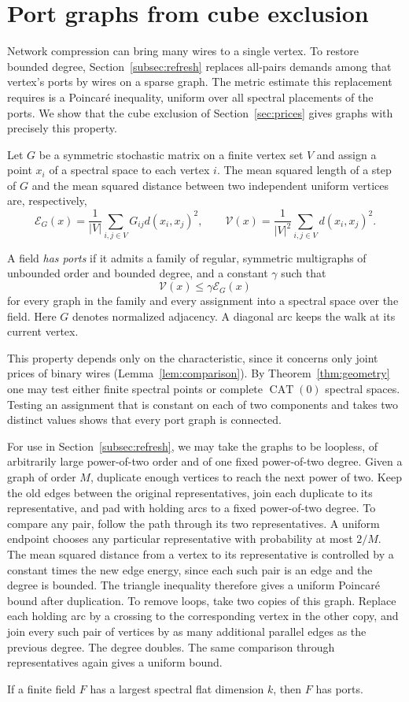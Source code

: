 \section{Port graphs from cube exclusion}\label{sec:ports}

Network compression can bring many wires to a single vertex. To restore
bounded degree, Section~\ref{subsec:refresh} replaces all-pairs demands
among that vertex's ports by wires on a sparse graph. The metric estimate
this replacement requires is a Poincar\'e inequality, uniform over all
spectral placements of the ports. We show that the cube exclusion of
Section~\ref{sec:prices} gives graphs with precisely this property.

Let $G$ be a symmetric stochastic matrix on a finite vertex set $V$
and assign a point $x_i$ of a spectral space to each vertex $i$. The
mean squared length of a step of $G$ and the mean squared distance
between two independent uniform vertices are, respectively,
\[
 \mathcal E_G(x)=\frac1{|V|}\sum_{i,j\in V}G_{ij}d(x_i,x_j)^2,
 \qquad
 \mathcal V(x)=\frac1{|V|^2}\sum_{i,j\in V}d(x_i,x_j)^2.
\]

\begin{definition}\label{def:ports}
A field \emph{has ports} if it admits a family of regular, symmetric
multigraphs of unbounded order and bounded degree, and a constant
$\gamma$ such that
\[
 \mathcal V(x)\le\gamma\mathcal E_G(x)
\]
for every graph in the family and every assignment into a spectral space
over the field. Here $G$ denotes normalized adjacency. A diagonal arc
keeps the walk at its current vertex.
\end{definition}
This property depends only on the characteristic, since it concerns
only joint prices of binary wires (Lemma~\ref{lem:comparison}).
By Theorem~\ref{thm:geometry} one may test either finite spectral
points or complete $\operatorname{CAT}(0)$ spectral spaces. Testing
an assignment that is constant on each of two components and takes two
distinct values shows that every port graph is connected.

For use in Section~\ref{subsec:refresh}, we may take the graphs to be
loopless, of arbitrarily large power-of-two order and of one fixed
power-of-two degree. Given a graph of order $M$, duplicate enough
vertices to reach the next power of two. Keep the old edges between
the original representatives, join each duplicate to its representative,
and pad with holding arcs to a fixed power-of-two degree. To compare any
pair, follow the path through its two representatives. A uniform endpoint
chooses any particular representative with probability at most $2/M$.
The mean squared distance from a vertex to its representative is controlled
by a constant times the new edge energy, since each such pair is an edge
and the degree is bounded. The triangle inequality therefore gives a
uniform Poincar\'e bound after duplication. To remove loops, take two
copies of this graph. Replace each holding arc by a crossing to the
corresponding vertex in the other copy, and join every such pair of vertices
by as many additional parallel edges as the previous degree. The degree
doubles. The same comparison through representatives again gives a
uniform bound.

\begin{proposition}\label{lem:refresh-graph}\label{lem:ports}
If a finite field $F$ has a largest spectral flat dimension $k$, then
$F$ has ports.
\end{proposition}


